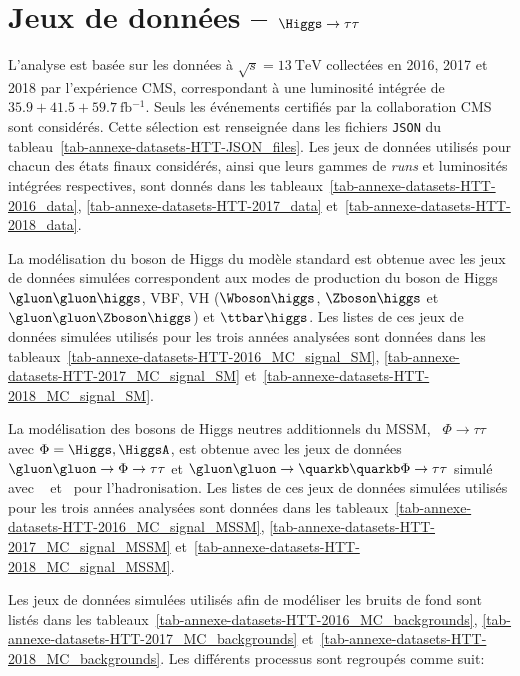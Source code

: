\chapter{Jeux de données -- $\Higgs\to\tau\tau$}\label{annexe-datasets-HTT}
L'analyse est basée sur les données à $\sqrt{s}=\SI{13}{\TeV}$ collectées en 2016, 2017 et 2018 par l'expérience CMS, correspondant à une luminosité intégrée de $\num{35.9}+\num{41.5}+\SI{59.7}{\femto\barn^{-1}}$.
Seuls les événements certifiés par la collaboration CMS sont considérés. Cette sélection est renseignée dans les fichiers \texttt{JSON} du tableau~\ref{tab-annexe-datasets-HTT-JSON_files}.
Les jeux de données utilisés pour chacun des états finaux considérés, ainsi que leurs gammes de \emph{runs} et luminosités intégrées respectives, sont donnés dans les tableaux~\ref{tab-annexe-datasets-HTT-2016_data}, \ref{tab-annexe-datasets-HTT-2017_data} et~\ref{tab-annexe-datasets-HTT-2018_data}.
\par
La modélisation du boson de Higgs du modèle standard
est obtenue avec les jeux de données simulées correspondent aux modes de production du boson de Higgs
$\gluon\gluon\higgs$,
VBF,
VH ($\Wboson\higgs$, $\Zboson\higgs$ et $\gluon\gluon\Zboson\higgs$) et
$\ttbar\higgs$.
Les listes de ces jeux de données simulées utilisés pour les trois années analysées sont données dans les tableaux~\ref{tab-annexe-datasets-HTT-2016_MC_signal_SM}, \ref{tab-annexe-datasets-HTT-2017_MC_signal_SM} et~\ref{tab-annexe-datasets-HTT-2018_MC_signal_SM}.
\par
La modélisation des bosons de Higgs neutres additionnels du MSSM,
\ie\ $\Phi\to\tau\tau$ avec $\Phi=\Higgs,\HiggsA$,
est obtenue avec les jeux de données
$\gluon\gluon\to\Phi\to\tau\tau$ %
et
$\gluon\gluon\to\quarkb\quarkb\Phi\to\tau\tau$ simulé avec \AMCATNLO~\cite{amcatnlo} et \PYTHIA\ pour l'hadronisation.
Les listes de ces jeux de données simulées utilisés pour les trois années analysées sont données dans les tableaux~\ref{tab-annexe-datasets-HTT-2016_MC_signal_MSSM}, \ref{tab-annexe-datasets-HTT-2017_MC_signal_MSSM} et~\ref{tab-annexe-datasets-HTT-2018_MC_signal_MSSM}.
\par
Les jeux de données simulées utilisés afin de modéliser les bruits de fond sont listés dans les tableaux~\ref{tab-annexe-datasets-HTT-2016_MC_backgrounds}, \ref{tab-annexe-datasets-HTT-2017_MC_backgrounds} et~\ref{tab-annexe-datasets-HTT-2018_MC_backgrounds}.
Les différents processus sont regroupés comme suit:

\vspace{.5\baselineskip}


